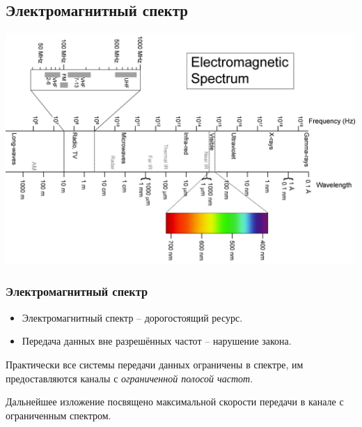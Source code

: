 \documentclass[utf8]{beamer}
\begin{document}
\subsection{Электромагнитный спектр}
\begin{frame}
\begin{center}
\includegraphics[width=1.05\textwidth]{pic/spectrum.png}
\end{center}
\end{frame}
\begin{frame}
\frametitle{Электромагнитный спектр}
\begin{itemize}
	\item Электромагнитный спектр -- дорогостоящий ресурс.
	\item Передача данных вне разрешённых частот -- нарушение закона.
\end{itemize}
Практически все системы передачи данных ограничены в спектре, им предоставляются каналы с \emph{ограниченной полосой частот}.

Дальнейшее изложение посвящено максимальной скорости передачи в канале с ограниченным спектром.
\end{frame}
\end{document}
